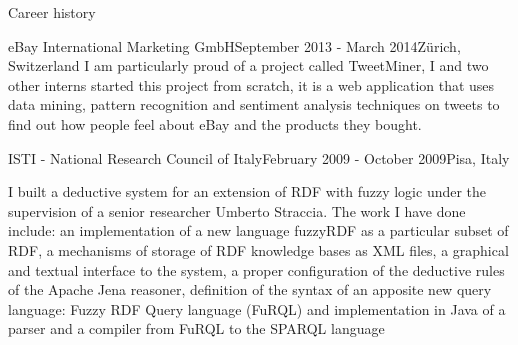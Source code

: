 \documentclass{resume}
\begin{document}
\begin{rSection}{Career history}
\begin{rSubsection}{eBay International Marketing GmbH}{September 2013 - March 2014}{}{Z\"urich, Switzerland}
			I am particularly proud of a project called TweetMiner, 
			I and two other interns started this project from scratch,
			it is a web application that uses data mining, pattern recognition and sentiment analysis techniques on tweets to find out how people feel about eBay and the products they bought. 
		\end{rSubsection}
		\begin{rSubsection}{ISTI - National Research Council of Italy}{February 2009 - October 2009}{}{Pisa, Italy}
		\item[\null]
			I built a deductive system for an extension of RDF with fuzzy logic under the supervision of a senior researcher Umberto Straccia.
			The work I have done include:
			an implementation of a new language fuzzyRDF as a particular subset of RDF,
			a mechanisms of storage of RDF knowledge bases as XML files,
			a graphical and textual interface to the system,
			a proper configuration of the deductive rules of the Apache Jena reasoner,
			definition of the syntax of an apposite new query language: Fuzzy RDF Query language (FuRQL)
			and implementation in Java of a parser and a compiler from FuRQL to the SPARQL language \\ 
		\end{rSubsection}
	\end{rSection}
\end{document}
